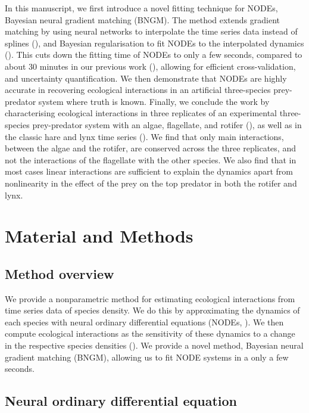 \documentclass[11pt, oneside]{article}
\begin{document}
In this manuscript, we first introduce a novel fitting technique for NODEs, Bayesian neural gradient matching (BNGM). 
The method extends gradient matching by using neural networks to interpolate the time series data instead of splines (\cite{Ellner2002}), and Bayesian regularisation to fit NODEs to the interpolated dynamics (\cite{Cawley2007}). 
This cuts down the fitting time of NODEs to only a few seconds, compared to about 30 minutes in our previous work (\cite{Bonnaffe2021a}), allowing for efficient cross-validation, and uncertainty quantification.
We then demonstrate that NODEs are highly accurate in recovering ecological interactions in an artificial three-species prey-predator system where truth is known.
Finally, we conclude the work by characterising ecological interactions in three replicates of an experimental three-species prey-predator system with an algae, flagellate, and rotifer (\cite{Hiltunen2013}), as well as in the classic hare and lynx time series (\cite{Odum1972}).
We find that only main interactions, between the algae and the rotifer, are conserved across the three replicates, and not the interactions of the flagellate with the other species.
We also find that in most cases linear interactions are sufficient to explain the dynamics apart from nonlinearity in the effect of the prey on the top predator in both the rotifer and lynx.

\section{Material and Methods}

\subsection{Method overview}

We provide a nonparametric method for estimating ecological interactions from time series data of species density. 
We do this by approximating the dynamics of each species with neural ordinary differential equations (NODEs, \cite{Bonnaffe2021a}). 
We then compute ecological interactions as the sensitivity of these dynamics to a change in the respective species densities (\cite{Sugihara2012,Bonnaffe2021a}).
We provide a novel method, Bayesian neural gradient matching (BNGM), allowing us to fit NODE systems in a only a few seconds.

\subsection{Neural ordinary differential equation}
\end{document}
